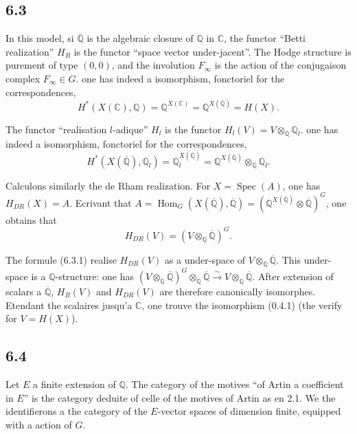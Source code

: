 \documentclass[12pt,a4paper]{article}
\theoremstyle{plain}
\theoremstyle{definition}
\theoremstyle{remark}
\DeclareMathOperator{\Hom}{Hom}
\DeclareMathOperator{\Spec}{Spec}
\newcommand{\Q}{\mathbb{Q}}
\newcommand{\C}{\mathbb{C}}
\begin{document}
\subsection*{6.3}

In this model, si $\overline{\Q}$ is the algebraic closure of $\Q$ in $\C$, the functor
``Betti realization'' $H_B$ is the functor ``space vector under-jacent''. The Hodge structure is purement of type $(0,0)$, and the involution $F_\infty$ is the action of the
conjugaison complex $F_\infty \in G$. one has indeed a isomorphism, fonctoriel for the
correspondences,
\[
H^*(X(\C), \Q) = \Q^{X(\C)} = \Q^{X(\overline{\Q})} = H(X).
\]

The functor ``realisation $l$-adique'' $H_l$ is the functor $H_l(V) = V \otimes_\Q \Q_l$.
one has indeed a isomorphism, fonctoriel for the correspondences,
\[
H^*(X(\overline{\Q}), \Q_l) = \Q_l^{X(\overline{\Q})} = \Q^{X(\overline{\Q})} \otimes_\Q \Q_l.
\]

Calculons similarly the de Rham realization. For $X = \Spec(A)$, one has
$H_{DR}(X) = A$. Ecrivant that $A = \Hom_G(X(\overline{\Q}), \overline{\Q}) = (\Q^{X(\overline{\Q})} \otimes \overline{\Q})^G$,
one obtains that
\begin{equation}\label{eq:6.3.1}
H_{DR}(V) = (V \otimes_\Q \overline{\Q})^G.
\end{equation}

The formule (6.3.1) realise $H_{DR}(V)$ as a under-space of $V \otimes_\Q \overline{\Q}$. This under-
space is a $\Q$-structure: one has $(V \otimes_\Q \overline{\Q})^G \otimes_\Q \overline{\Q} \xrightarrow{\sim} V \otimes_\Q \overline{\Q}$.
After extension of scalars a $\overline{\Q}$, $H_B(V)$ and $H_{DR}(V)$ are therefore canonically
isomorphes. Etendant the scalaires jusqu'a $\C$, one trouve the isomorphism (0.4.1) (the
verify for $V = H(X)$).

\subsection*{6.4}

Let $E$ a finite extension of $\Q$. The category of the motives ``of Artin a coefficient
in $E$'' is the category deduite of celle of the motives of Artin as en 2.1. We
the identifierons a the category of the $E$-vector spaces of dimension finite, equipped with a action of $G$.
\end{document}
